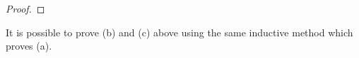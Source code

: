\begin{proof}
\end{proof}
\begin{remark}
    It is possible to prove (b) and (c) above using the same inductive method which proves (a). %
\end{remark}
